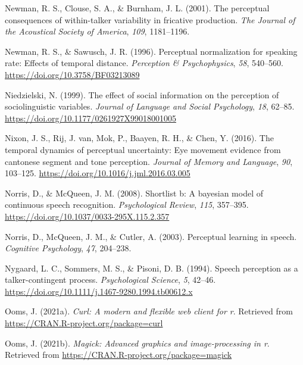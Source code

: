 \documentclass[
  11pt,
  english,
  man,floatsintext]{apa6}
\newlength{\cslhangindent}
\newlength{\cslentryspacingunit} %
\newenvironment{CSLReferences}[2] %
 {%
  \setlength{\parindent}{0pt}
  \ifodd #1
  \let\oldpar\par
  \def\par{\hangindent=\cslhangindent\oldpar}
  \fi
  \setlength{\parskip}{#2\cslentryspacingunit}
 }%
 {}
\begin{document}
\begin{CSLReferences}{1}{0}
\leavevmode{}%
Newman, R. S., Clouse, S. A., \& Burnham, J. L. (2001). The perceptual consequences of within-talker variability in fricative production. \emph{The Journal of the Acoustical Society of America}, \emph{109}, 1181--1196.

\leavevmode{}%
Newman, R. S., \& Sawusch, J. R. (1996). Perceptual normalization for speaking rate: Effects of temporal distance. \emph{Perception \& Psychophysics}, \emph{58}, 540--560. \url{https://doi.org/10.3758/BF03213089}

\leavevmode{}%
Niedzielski, N. (1999). The effect of social information on the perception of sociolinguistic variables. \emph{Journal of Language and Social Psychology}, \emph{18}, 62--85. \url{https://doi.org/10.1177/0261927X99018001005}

\leavevmode{}%
Nixon, J. S., Rij, J. van, Mok, P., Baayen, R. H., \& Chen, Y. (2016). The temporal dynamics of perceptual uncertainty: Eye movement evidence from cantonese segment and tone perception. \emph{Journal of Memory and Language}, \emph{90}, 103--125. \url{https://doi.org/10.1016/j.jml.2016.03.005}

\leavevmode{}%
Norris, D., \& McQueen, J. M. (2008). Shortlist b: A bayesian model of continuous speech recognition. \emph{Psychological Review}, \emph{115}, 357--395. \url{https://doi.org/10.1037/0033-295X.115.2.357}

\leavevmode{}%
Norris, D., McQueen, J. M., \& Cutler, A. (2003). Perceptual learning in speech. \emph{Cognitive Psychology}, \emph{47}, 204--238.

\leavevmode{}%
Nygaard, L. C., Sommers, M. S., \& Pisoni, D. B. (1994). Speech perception as a talker-contingent process. \emph{Psychological Science}, \emph{5}, 42--46. \url{https://doi.org/10.1111/j.1467-9280.1994.tb00612.x}

\leavevmode{}%
Ooms, J. (2021a). \emph{Curl: A modern and flexible web client for r}. Retrieved from \url{https://CRAN.R-project.org/package=curl}

\leavevmode{}%
Ooms, J. (2021b). \emph{Magick: Advanced graphics and image-processing in r}. Retrieved from \url{https://CRAN.R-project.org/package=magick}


\end{CSLReferences}
\end{document}
